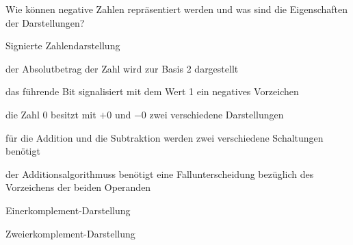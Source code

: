 \documentclass
[
  draft    = true,
  fontsize = 11pt,
  parskip  = half-,
  BCOR     = 0pt,
  DIV      = 11,
  ngerman,
  dvipsnames
]
{scrartcl}
\begin{document}
\begin{mytemize}
  \item Wie können negative Zahlen repräsentiert werden und was sind die Eigenschaften der Darstellungen?
        \begin{achim}
          \begin{mytemize}
            \item Signierte Zahlendarstellung
                  \begin{mytemize}
                    \item der Absolutbetrag der Zahl wird zur Basis 2 dargestellt
                    \item das führende Bit signalisiert mit dem Wert 1 ein negatives Vorzeichen
                    \item die Zahl 0 besitzt mit $+0$ und $-0$ zwei verschiedene Darstellungen
                    \item für die Addition und die Subtraktion werden zwei verschiedene Schaltungen benötigt
                    \item der Additionsalgorithmuss benötigt eine Fallunterscheidung bezüglich des Vorzeichens der beiden Operanden
                  \end{mytemize}
            \item Einerkomplement-Darstellung
            \item Zweierkomplement-Darstellung
          \end{mytemize}
        \end{achim}
\end{mytemize}

\end{document}
